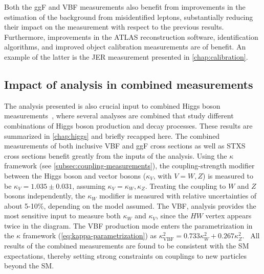 Both the ggF and VBF measurements also benefit from improvements in the estimation of the background from misidentified leptons, substantially reducing their impact on the measurement with respect to the previous results. 
Furthermore, improvements in the ATLAS reconstruction software, identification algorithms, and improved object calibration measurements are of benefit. 
An example of the latter is the JER measurement presented in \cref{chap:calibration}. 

\subsection{Impact of analysis in combined measurements}
The analysis presented is also crucial input to combined Higgs boson measurements~\cite{NaturePaper}, where several analyses are combined that study different combinations of Higgs boson production and decay processes. These results are summarized in \cref{chap:higgs} and briefly recapped here.
The combined measurements of both inclusive VBF and ggF cross sections as well as STXS cross sections benefit greatly from the inputs of the \HWW analysis.
Using the $\kappa$ framework (see \cref{subsec:coupling-measurements}), the coupling-strength modifier between the Higgs boson and vector bosons ($\kappa_V$, with $V = W, Z$) is measured to be $\kappa_{V} = 1.035 \pm 0.031$, assuming $\kappa_V = \kappa_W, \kappa_Z$.
Treating the coupling to $W$ and $Z$ bosons independently, the $\kappa_W$ modifier is measured with relative uncertainties of about 5-10\%, depending on the model assumed. 
The VBF, \HWW analysis provides the most sensitive input to measure both $\kappa_W$ and $\kappa_V$, since the $HW$ vertex appears twice in the diagram. The VBF production mode enters the parametrization in the $\kappa$ framework (\cref{eq:kappa-parametrization}) as $\kappa_\mathrm{VBF}^2 = 0.733 \kappa^2_W + 0.267 \kappa^2_Z$.~\cite{NaturePaper} 
All results of the combined measurements are found to be consistent with the SM expectations, thereby setting strong constraints on couplings to new particles beyond the SM.  


